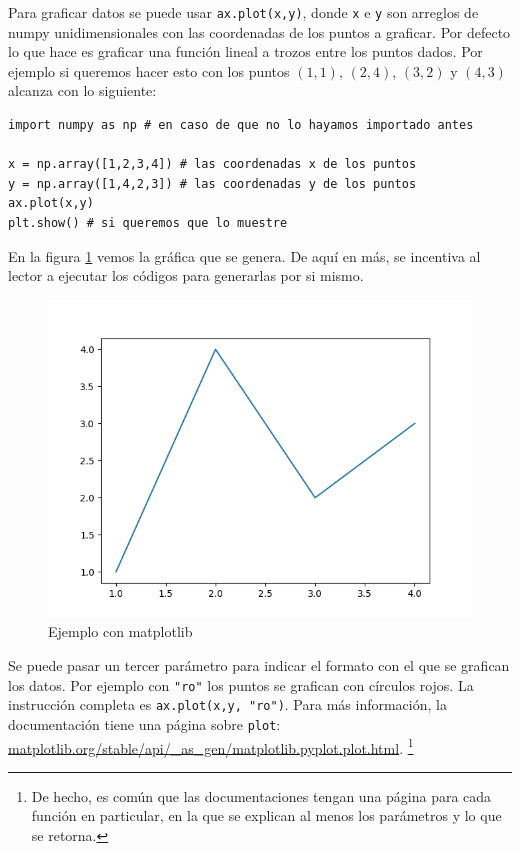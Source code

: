 \documentclass[a4paper, 12pt]{report}
\theoremstyle{definition}
\begin{document}
Para graficar datos se puede usar {\tt ax.plot(x,y)}, donde {\tt x} e {\tt y} son arreglos de numpy unidimensionales con las coordenadas de los puntos a graficar. Por defecto lo que hace es graficar una función lineal a trozos entre los puntos dados. Por ejemplo si queremos hacer esto con los puntos $(1,1)$, $(2,4)$, $(3,2)$ y $(4,3)$ alcanza con lo siguiente:
\begin{verbatim}
import numpy as np # en caso de que no lo hayamos importado antes

x = np.array([1,2,3,4]) # las coordenadas x de los puntos
y = np.array([1,4,2,3]) # las coordenadas y de los puntos
ax.plot(x,y)
plt.show() # si queremos que lo muestre
\end{verbatim}
En la figura \ref{fig-ejMPL} vemos la gráfica que se genera. De aquí en más, se incentiva al lector a ejecutar los códigos para generarlas por si mismo.
\begin{figure}
	\centering
	\includegraphics[scale=0.7]{ejemploGrafMPL.png}
	\caption{Ejemplo con matplotlib}
	\label{fig-ejMPL}
\end{figure}

Se puede pasar un tercer parámetro para indicar el formato con el que se grafican los datos. Por ejemplo con {\tt "ro"} los puntos se grafican con círculos rojos. La instrucción completa es {\tt ax.plot(x,y, "ro")}. Para más información, la documentación tiene una página sobre {\tt plot}: \href{https://matplotlib.org/stable/api/_as_gen/matplotlib.pyplot.plot.html}{matplotlib.org/stable/api/\_as\_gen/matplotlib.pyplot.plot.html}. \footnote{De hecho, es común que las documentaciones tengan una página para cada función en particular, en la que se explican al menos los parámetros y lo que se retorna.}
\end{document}
